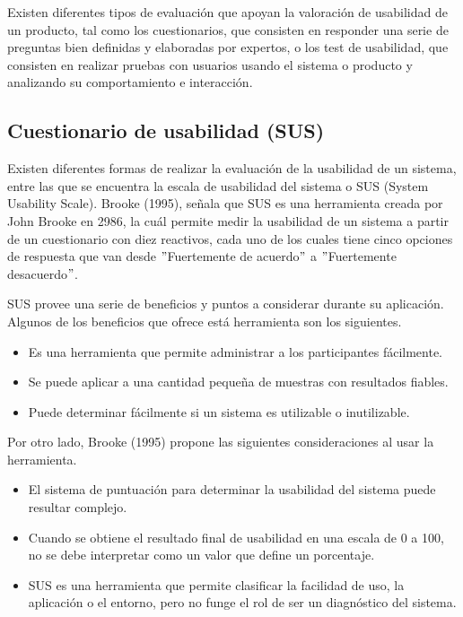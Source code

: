 Existen diferentes tipos de evaluación que apoyan la valoración de usabilidad de un producto, tal como los cuestionarios, que consisten en responder una serie de preguntas bien definidas y elaboradas por expertos, o los test de usabilidad, que consisten en realizar pruebas con usuarios usando el sistema o producto y analizando su comportamiento e interacción.


\subsection{Cuestionario de usabilidad (SUS)}
\label{SUSCap3}

Existen diferentes formas de realizar la evaluación de la usabilidad de un sistema, entre las que se encuentra la escala de usabilidad del sistema o SUS (System Usability Scale). Brooke (1995), señala que SUS es una herramienta creada por John Brooke en 2986, la cuál permite medir la usabilidad de un sistema a partir de un cuestionario con diez reactivos, cada uno de los cuales tiene cinco opciones de respuesta que van desde $"$Fuertemente de acuerdo$"$ a $"$Fuertemente desacuerdo$"$.

SUS provee una serie de beneficios y puntos a considerar durante su aplicación. Algunos de los beneficios que ofrece está herramienta son los siguientes.

\begin{itemize}
  \item Es una herramienta que permite administrar a los participantes fácilmente.
  \item Se puede aplicar a una cantidad pequeña de muestras con resultados fiables.
  \item Puede determinar fácilmente si un sistema es utilizable o inutilizable.
\end{itemize}

Por otro lado, Brooke (1995) propone las siguientes consideraciones al usar la herramienta.

\begin{itemize}
  \item El sistema de puntuación para determinar la usabilidad del sistema puede resultar complejo.
  \item Cuando se obtiene el resultado final de usabilidad en una escala de 0 a 100, no se debe interpretar como un valor que define un porcentaje.
  \item SUS es una herramienta que permite clasificar la facilidad de uso, la aplicación o el entorno, pero no funge el rol de ser un diagnóstico del sistema.
\end{itemize}

